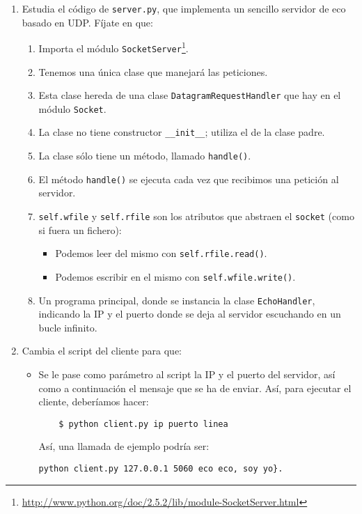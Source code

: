\documentclass[11pt,a4paper]{article}
\begin{document}
\begin{enumerate}
  \item Estudia el código de \texttt{server.py}, que implementa un sencillo servidor de eco basado en UDP. Fíjate en que:
  \begin{enumerate}
    \item Importa el módulo \texttt{SocketServer}\footnote{\url{http://www.python.org/doc/2.5.2/lib/module-SocketServer.html}}.
    \item Tenemos una única clase que manejará las peticiones.
    \item Esta clase hereda de una clase \texttt{DatagramRequestHandler} que hay en el módulo \texttt{Socket}.
    \item La clase no tiene constructor \texttt{\_\_init\_\_}; utiliza el de la clase padre.
    \item La clase sólo tiene un método, llamado \texttt{handle()}.
    \item El método \texttt{handle()} se ejecuta cada vez que recibimos una petición al servidor.
    \item \texttt{self.wfile} y \texttt{self.rfile} son los atributos que abstraen el \texttt{socket} (como si fuera un fichero):
    \begin{itemize}
      \item Podemos leer del mismo con \texttt{self.rfile.read()}.
      \item Podemos escribir en el mismo con \texttt{self.wfile.write()}.
    \end{itemize}
    \item Un programa principal, donde se instancia la clase \texttt{EchoHandler}, indicando la IP y el puerto donde se deja al servidor escuchando en un bucle infinito.
  \end{enumerate}

  \item Cambia el script del cliente para que:
  \begin{itemize}
    \item Se le pase como parámetro al script la IP y el puerto del servidor, así como a continuación el mensaje que se ha de enviar. Así, para ejecutar el cliente, deberíamos hacer:
    \begin{verbatim}
	$ python client.py ip puerto linea
    \end{verbatim}
  Así, una llamada de ejemplo podría ser: 
\begin{verbatim}
python client.py 127.0.0.1 5060 eco eco, soy yo}.
\end{verbatim}
  \end{itemize}


\end{enumerate}
\end{document}

